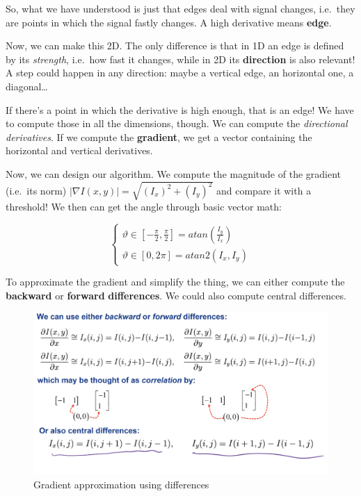 \documentclass{article}
\begin{document}
So, what we have understood is just that edges deal with signal changes,
i.e.~they are points in which the signal fastly changes. A high
derivative means \textbf{edge}.

Now, we can make this 2D. The only difference is that in 1D an edge is
defined by its \emph{strength}, i.e.~how fast it changes, while in 2D
its \textbf{direction} is also relevant! A step could happen in any
direction: maybe a vertical edge, an horizontal one, a diagonal\ldots{}

If there's a point in which the derivative is high enough, that is an
edge! We have to compute those in all the dimensions, though. We can
compute the \emph{directional derivatives}. If we compute the
\textbf{gradient}, we get a vector containing the horizontal and
vertical derivatives.

Now, we can design our algorithm. We compute the magnitude of the
gradient (i.e.~its norm)
\(|\nabla I(x, y)|=\sqrt{\left(I_{x}\right)^{2}+\left(I_{y}\right)^{2}}\)
and compare it with a threshold! We then can get the angle through basic
vector math:

\[
\left\{\begin{array}{l}
\vartheta \in\left[-\frac{\pi}{2}, \frac{\pi}{2}\right]=atan\left(\frac{I_{y}}{I_{x}}\right) \\
\vartheta \in[0,2 \pi]=atan 2\left(I_{x}, I_{y}\right)
\end{array}\right.
\]

To approximate the gradient and simplify the thing, we can either
compute the \textbf{backward} or \textbf{forward} \textbf{differences}.
We could also compute central differences.

\begin{figure}
\centering
\includegraphics{./res/gradient-approximation.png}
\caption{Gradient approximation using differences}
\end{figure}
\end{document}
